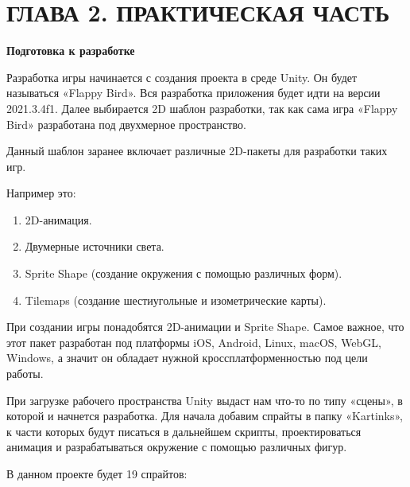 \documentclass[14pt, oneside]{altsu-report}
\begin{document}
\chapter{ГЛАВА 2. ПРАКТИЧЕСКАЯ ЧАСТЬ}

\textbf{Подготовка к разработке}

Разработка игры начинается с создания проекта в среде Unity. Он будет называться «Flappy Bird». Вся разработка приложения будет идти на версии 2021.3.4f1. Далее выбирается 2D шаблон разработки, так как сама игра «Flappy Bird» разработана под двухмерное пространство. 

Данный шаблон заранее включает различные 2D-пакеты для разработки таких игр. 

Например это: 

\begin{enumerate}
\item 2D-анимация.
\item Двумерные источники света.
\item Sprite Shape (создание окружения с помощью различных форм).
\item Tilemaps (создание шестиугольные и изометрические карты).
\end{enumerate} 

При создании игры понадобятся 2D-анимации и  Sprite Shape. Самое важное, что этот пакет разработан под платформы iOS, Android, Linux, macOS, WebGL, Windows, а значит он обладает нужной кроссплатформенностью под цели работы.

При загрузке рабочего пространства Unity выдаст нам что-то по типу «сцены», в которой и начнется разработка. Для начала добавим спрайты в папку «Kartinks», к части которых будут писаться в дальнейшем скрипты, проектироваться анимация и разрабатываться окружение с помощью различных фигур.

В данном проекте будет 19 спрайтов:
\end{document}
